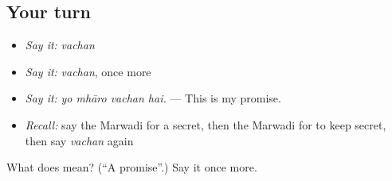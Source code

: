 \subsection*{Your turn}
\begin{itemize}
\raggedright
  \item \emph{Say it:} \emph{vachan}
  \item \emph{Say it:} \emph{vachan}, once more
  \item \emph{Say it:} \emph{yo mhāro vachan hai.} — This is my promise.
  \item \emph{Recall:} say the Marwadi for a secret, then the Marwadi for to keep secret, then say \emph{vachan} again
\end{itemize}

\begin{tcolorbox}[breakable,colback=teal!4,colframe=teal!35!black,title={Before you move on}]
What does  mean? (\textquotedblleft{}A promise\textquotedblright{}.) Say it once more.
\end{tcolorbox}
